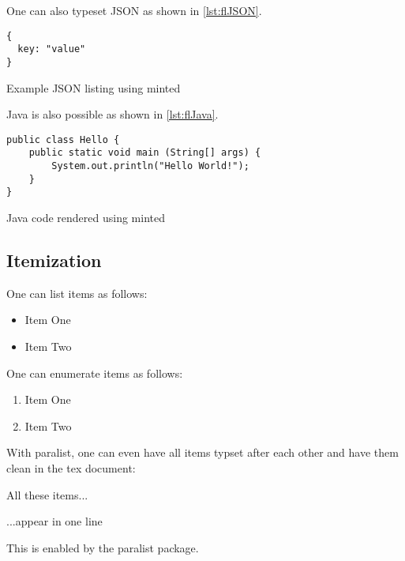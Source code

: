 \documentclass[runningheads,a4paper,english]{llncs}[2022/01/12]
\begin{document}
One can also typeset JSON as shown in \cref{lst:flJSON}.

\begin{ltgexample}
\begin{listing}[htbp]
    \begin{verbatim}
{
  key: "value"
}
\end{verbatim}
  \caption{Example JSON listing using minted}
  \label{lst:flJSON}
\end{listing}
\end{ltgexample}

Java is also possible as shown in \cref{lst:flJava}.

\begin{ltgexample}
\begin{listing}[htbp]
    \begin{verbatim}
public class Hello {
    public static void main (String[] args) {
        System.out.println("Hello World!");
    }
}
\end{verbatim}
  \caption{Java code rendered using minted}
  \label{lst:flJava}
\end{listing}
\end{ltgexample}

\subsection{Itemization}

One can list items as follows:

\begin{ltgexample}
\begin{itemize}
\item Item One
\item Item Two
\end{itemize}
\end{ltgexample}


One can enumerate items as follows:

\begin{ltgexample}
\begin{enumerate}
  \item Item One
  \item Item Two
\end{enumerate}
\end{ltgexample}


With paralist, one can even have all items typset after each other and have them clean in the tex document:

\begin{ltgexample}
\begin{inparaenum}
  \item All these items...
  \item ...appear in one line
  \item This is enabled by the paralist package.
\end{inparaenum}
\end{ltgexample}
\end{document}
